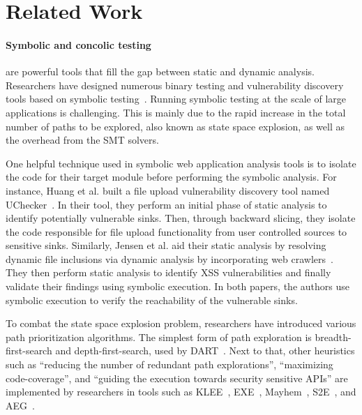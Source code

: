 \section{Related Work}

\paragraph{Symbolic and concolic testing} are powerful tools that fill the gap between static and dynamic analysis. 
Researchers have designed numerous binary testing and vulnerability discovery tools based on symbolic testing~\cite{cadar2008exe, cadar2008klee, chipounov2009selective, godefroid2012sage, cha2012unleashing, wang2017angr}. 
Running symbolic testing at the scale of large applications is challenging. 
This is mainly due to the rapid increase in the total number of paths to be explored, also known as state space explosion, as well as the overhead from the SMT solvers. 

One helpful technique used in symbolic web application analysis tools is to isolate the code for their target module before performing the symbolic analysis. 
For instance, Huang et al. built a file upload vulnerability discovery tool named UChecker~\cite{Huang2019}. 
In their tool, they perform an initial phase of static analysis to identify potentially vulnerable sinks. 
Then, through backward slicing, they isolate the code responsible for file upload functionality from user controlled sources to sensitive sinks. 
Similarly, Jensen et al. aid their static analysis by resolving dynamic file inclusions via dynamic analysis by incorporating web crawlers~\cite{jensen2012thaps}. 
They then perform static analysis to identify XSS vulnerabilities and finally validate their findings using symbolic execution. 
In both papers, the authors use symbolic execution to verify the reachability of the vulnerable sinks. 


To combat the state space explosion problem, researchers have introduced various path prioritization algorithms. 
The simplest form of path exploration is breadth-first-search and depth-first-search, used by DART~\cite{godefroid2005dart}. 
Next to that, other heuristics such as ``reducing the number of redundant path explorations'', ``maximizing code-coverage'', and ``guiding the execution towards security sensitive APIs'' are implemented by researchers in tools such as KLEE~\cite{cadar2008klee}, EXE~\cite{cadar2008exe}, Mayhem~\cite{cha2012unleashing}, S2E~\cite{cha2012unleashing}, and AEG~\cite{avgerinos2014automatic}. 

